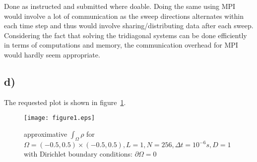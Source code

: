 \documentclass[11pt,a4paper]{article}
\begin{document}
Done as instructed and submitted where doable. Doing the same using MPI would involve a lot of communication
as the sweep directions alternates within each time step and thus would involve sharing/distributing data
after each sweep. Considering the fact that solving the tridiagonal systems can be done efficiently in 
terms of computations and memory, the communication overhead for MPI would hardly seem appropriate.


\subsection{d)}

The requested plot is shown in figure~\ref{fig:1}.

\begin{figure}[ht]
\begin{center}
\texttt{[image: figure1.eps]} 
\end{center}
\caption{approximative $\int_{\Omega}\rho$ for $\Omega= (-0.5,0.5) \times (-0.5, 0.5), L=1, N=256, \Delta t = 10^{-6}s, D=1$ with Dirichlet boundary conditions: $\partial\Omega = 0$}
\label{fig:1}
\end{figure}
\end{document}
